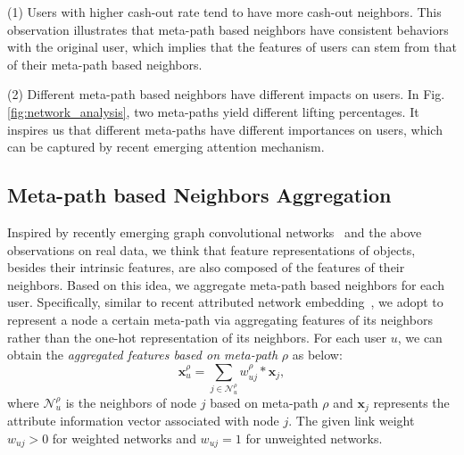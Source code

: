 (1) Users with higher cash-out rate tend to have more cash-out neighbors.
This observation illustrates that 
meta-path based neighbors have consistent behaviors with the original user, which implies that the features of users can stem from that of their meta-path based neighbors.

(2) Different meta-path based neighbors have different impacts on users. In Fig. \ref{fig:network_analysis}, two meta-paths yield different lifting percentages. %
It inspires us that different meta-paths have different importances on users, which can be captured by recent emerging attention mechanism.

\subsection{Meta-path based Neighbors Aggregation}
Inspired by recently emerging graph convolutional networks~\citep{Kipf2016Semi,dai2016discriminative} and the above observations on real data, we think that feature representations of objects, besides their intrinsic features, are also composed of the features of their neighbors. Based on this idea, we aggregate meta-path based neighbors for each user. 
Specifically, similar to recent attributed network embedding~\citep{liang2018semi,zhang2018anrl}, we adopt to represent a node \wrt a certain meta-path via aggregating features of its neighbors rather than the one-hot representation of its neighbors. For each user $u$, we can obtain the \emph{aggregated features based on meta-path} $\rho$ as below:
\begin{equation}
\mathbf{x}^{\rho}_u = \sum_{j \in \mathcal{N}^{\rho}_u}{w^{\rho}_{uj} * \mathbf{x}_j},
\end{equation}
where $\mathcal{N}^{\rho}_u$ is the neighbors of node $j$ based on meta-path $\rho$ and $\mathbf{x}_j$ represents the attribute information vector associated with node $j$. The given link weight $w_{uj} > 0$ for weighted networks and $w_{uj} = 1$ for unweighted networks.


